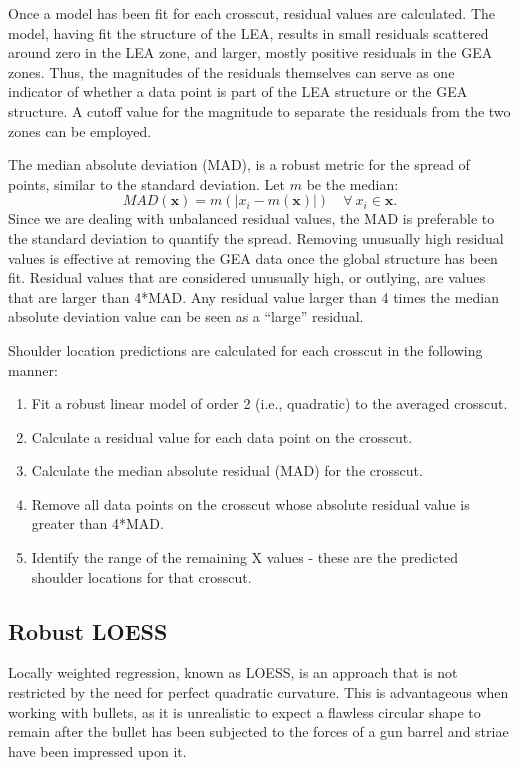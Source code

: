 \documentclass[]{article}
\begin{document}
Once a model has been fit for each crosscut, residual values are
calculated. The model, having fit the structure of the LEA, results in
small residuals scattered around zero in the LEA zone, and larger,
mostly positive residuals in the GEA zones. Thus, the magnitudes of the
residuals themselves can serve as one indicator of whether a data point
is part of the LEA structure or the GEA structure. A cutoff value for
the magnitude to separate the residuals from the two zones can be
employed.

The median absolute deviation (MAD), is a robust metric for the spread
of points, similar to the standard deviation. Let \(m\) be the median:\\
\[ MAD(\mathbf{x}) = m(|x_i- m(\mathbf{x})|) \quad \forall\ x_i \in \mathbf{x}.\]
Since we are dealing with unbalanced residual values, the MAD is
preferable to the standard deviation to quantify the spread. Removing
unusually high residual values is effective at removing the GEA data
once the global structure has been fit. Residual values that are
considered unusually high, or outlying, are values that are larger than
4*MAD. Any residual value larger than 4 times the median absolute
deviation value can be seen as a ``large'' residual.

Shoulder location predictions are calculated for each crosscut in the
following manner:\\

\begin{enumerate}
\item Fit a robust linear model of order 2 (i.e., quadratic) to the averaged crosscut.   
\item Calculate a residual value for each data point on the crosscut.  
\item Calculate the median absolute residual (MAD) for the crosscut.  
\item Remove all data points on the crosscut whose absolute residual value is greater than 4*MAD.  
\item Identify the range of the remaining X values - these are the predicted shoulder locations for that crosscut.   
\end{enumerate}

\subsection{Robust LOESS}

Locally weighted regression, known as LOESS, is an approach that is not
restricted by the need for perfect quadratic curvature. This is
advantageous when working with bullets, as it is unrealistic to expect a
flawless circular shape to remain after the bullet has been subjected to
the forces of a gun barrel and striae have been impressed upon it.
\end{document}

